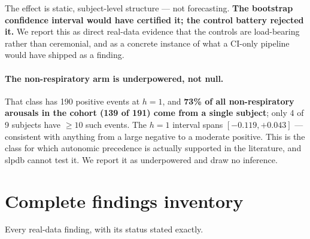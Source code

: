\documentclass[11pt]{article}
\begin{document}
The effect is static, subject-level structure --- not forecasting. \textbf{The
bootstrap confidence interval would have certified it; the control battery
rejected it.} We report this as direct real-data evidence that the controls are
load-bearing rather than ceremonial, and as a concrete instance of what a
CI-only pipeline would have shipped as a finding.

\paragraph{The non-respiratory arm is underpowered, not null.} That class has 190
positive events at $h=1$, and \textbf{73\% of all non-respiratory arousals in the
cohort (139 of 191) come from a single subject}; only 4 of 9 subjects have
$\geq 10$ such events. The $h=1$ interval spans $[-0.119, +0.043]$ --- consistent
with anything from a large negative to a moderate positive. This is the class for
which autonomic precedence is actually supported in the literature, and slpdb
cannot test it. We report it as underpowered and draw no inference.

\section{Complete findings inventory}

Every real-data finding, with its status stated exactly.
\end{document}
